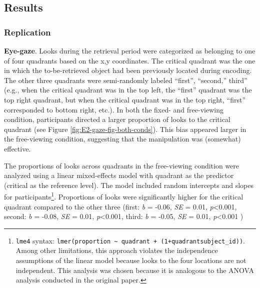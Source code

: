\documentclass[
  man,floatsintext]{apa6}
\begin{document}
\hypertarget{results-1}{%
\subsection{Results}\label{results-1}}

\hypertarget{replication}{%
\subsubsection{Replication}\label{replication}}

\textbf{Eye-gaze}. Looks during the retrieval period were categorized as belonging to one of four quadrants based on the x,y coordinates. The critical quadrant was the one in which the to-be-retrieved object had been previously located during encoding. The other three quadrants were semi-randomly labeled ``first'', ``second,'' third'' (e.g., when the critical quadrant was in the top left, the ``first'' quadrant was the top right quadrant, but when the critical quadrant was in the top right, ``first'' corresponded to bottom right, etc.). In both the fixed- and free-viewing condition, participants directed a larger proportion of looks to the critical quadrant (see Figure \ref{fig:E2-gaze-fig-both-conds}). This bias appeared larger in the free-viewing condition, suggesting that the manipulation was (somewhat) effective.

The proportions of looks across quadrants in the free-viewing condition were analyzed using a linear mixed-effects model with quadrant as the predictor (critical as the reference level). The model included random intercepts and slopes for participants\footnote{ \texttt{lme4} syntax: \texttt{lmer(proportion\ \textasciitilde{}\ quadrant\ +\ (1+quadrant\textbar{}subject\_id))}. Among other limitations, this approach violates the independence assumptions of the linear model because looks to the four locations are not independent. This analysis was chosen because it is analogous to the ANOVA analysis conducted in the original paper.}. Proportions of looks were significantly higher for the critical quadrant compared to the other three (first: \emph{b} = -0.06, \emph{SE} = 0.01, \emph{p}\textless0.001, second: \emph{b} = -0.08, \emph{SE} = 0.01, \emph{p}\textless0.001, third: \emph{b} = -0.05, \emph{SE} = 0.01, \emph{p}\textless0.001 )
\end{document}
